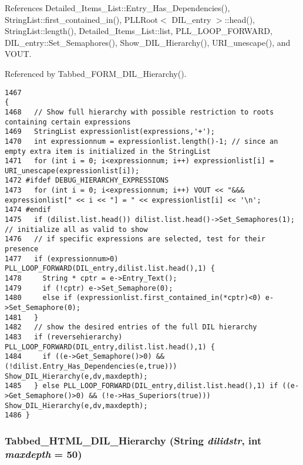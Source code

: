 References Detailed\_\-Items\_\-List::Entry\_\-Has\_\-Dependencies(), String\-List::first\_\-contained\_\-in(), PLLRoot$<$ DIL\_\-entry $>$::head(), String\-List::length(), Detailed\_\-Items\_\-List::list, PLL\_\-LOOP\_\-FORWARD, DIL\_\-entry::Set\_\-Semaphores(), Show\_\-DIL\_\-Hierarchy(), URI\_\-unescape(), and VOUT.

Referenced by Tabbed\_\-FORM\_\-DIL\_\-Hierarchy().



\footnotesize\begin{verbatim}1467                                                                                                                                                {
1468   // Show full hierarchy with possible restriction to roots containing certain expressions
1469   StringList expressionlist(expressions,'+');
1470   int expressionnum = expressionlist.length()-1; // since an empty extra item is initialized in the StringList
1471   for (int i = 0; i<expressionnum; i++) expressionlist[i] = URI_unescape(expressionlist[i]);
1472 #ifdef DEBUG_HIERARCHY_EXPRESSIONS
1473   for (int i = 0; i<expressionnum; i++) VOUT << "&&& expressionlist[" << i << "] = " << expressionlist[i] << '\n';
1474 #endif
1475   if (dilist.list.head()) dilist.list.head()->Set_Semaphores(1); // initialize all as valid to show
1476   // if specific expressions are selected, test for their presence
1477   if (expressionnum>0) PLL_LOOP_FORWARD(DIL_entry,dilist.list.head(),1) {
1478     String * cptr = e->Entry_Text();
1479     if (!cptr) e->Set_Semaphore(0);
1480     else if (expressionlist.first_contained_in(*cptr)<0) e->Set_Semaphore(0);
1481   }
1482   // show the desired entries of the full DIL hierarchy
1483   if (reversehierarchy) PLL_LOOP_FORWARD(DIL_entry,dilist.list.head(),1) {
1484     if ((e->Get_Semaphore()>0) && (!dilist.Entry_Has_Dependencies(e,true))) Show_DIL_Hierarchy(e,dv,maxdepth);
1485   } else PLL_LOOP_FORWARD(DIL_entry,dilist.list.head(),1) if ((e->Get_Semaphore()>0) && (!e->Has_Superiors(true))) Show_DIL_Hierarchy(e,dv,maxdepth);
1486 }
\end{verbatim}\normalsize 
{}
\subsubsection{ Tabbed\_\-HTML\_\-DIL\_\-Hierarchy ({\bf String} {\em dilidstr}, int {\em maxdepth} = 50)}\label{diladmin_8cc_a22}




